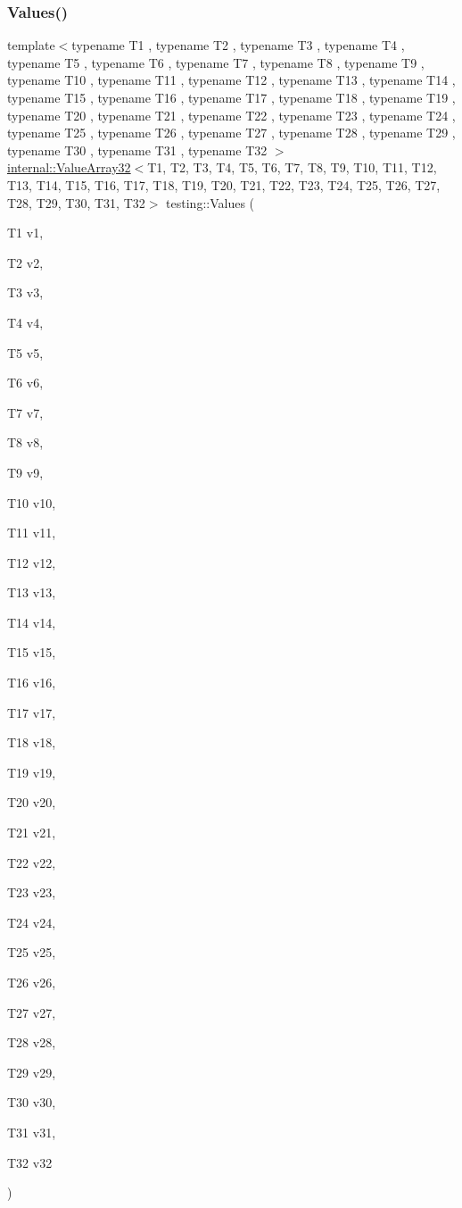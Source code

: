 \mbox{\label{namespacetesting_afeff614d4c808c753bbfa208409ad664}} 
\subsubsection{\texorpdfstring{Values()}{Values()}\hspace{0.1cm}{\footnotesize\ttfamily [32/50]}}
{\footnotesize\ttfamily template$<$typename T1 , typename T2 , typename T3 , typename T4 , typename T5 , typename T6 , typename T7 , typename T8 , typename T9 , typename T10 , typename T11 , typename T12 , typename T13 , typename T14 , typename T15 , typename T16 , typename T17 , typename T18 , typename T19 , typename T20 , typename T21 , typename T22 , typename T23 , typename T24 , typename T25 , typename T26 , typename T27 , typename T28 , typename T29 , typename T30 , typename T31 , typename T32 $>$ \\
\mbox{\hyperlink{classtesting_1_1internal_1_1ValueArray32}{internal\+::\+Value\+Array32}}$<$T1, T2, T3, T4, T5, T6, T7, T8, T9, T10, T11, T12, T13, T14, T15, T16, T17, T18, T19, T20, T21, T22, T23, T24, T25, T26, T27, T28, T29, T30, T31, T32$>$ testing\+::\+Values (\begin{DoxyParamCaption}\item[{T1}]{v1,  }\item[{T2}]{v2,  }\item[{T3}]{v3,  }\item[{T4}]{v4,  }\item[{T5}]{v5,  }\item[{T6}]{v6,  }\item[{T7}]{v7,  }\item[{T8}]{v8,  }\item[{T9}]{v9,  }\item[{T10}]{v10,  }\item[{T11}]{v11,  }\item[{T12}]{v12,  }\item[{T13}]{v13,  }\item[{T14}]{v14,  }\item[{T15}]{v15,  }\item[{T16}]{v16,  }\item[{T17}]{v17,  }\item[{T18}]{v18,  }\item[{T19}]{v19,  }\item[{T20}]{v20,  }\item[{T21}]{v21,  }\item[{T22}]{v22,  }\item[{T23}]{v23,  }\item[{T24}]{v24,  }\item[{T25}]{v25,  }\item[{T26}]{v26,  }\item[{T27}]{v27,  }\item[{T28}]{v28,  }\item[{T29}]{v29,  }\item[{T30}]{v30,  }\item[{T31}]{v31,  }\item[{T32}]{v32 }\end{DoxyParamCaption})}


